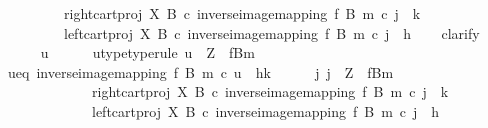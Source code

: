 \begin{isabellebody}
\ \ \ \ \ \ \ \ \ {\isacharparenleft}{\kern0pt}right{\isacharunderscore}{\kern0pt}cart{\isacharunderscore}{\kern0pt}proj\ X\ B\ {\isasymcirc}\isactrlsub c\ inverse{\isacharunderscore}{\kern0pt}image{\isacharunderscore}{\kern0pt}mapping\ f\ B\ m{\isacharparenright}{\kern0pt}\ {\isasymcirc}\isactrlsub c\ j\ {\isacharequal}{\kern0pt}\ k\ {\isasymand}\isanewline
\ \ \ \ \ \ \ \ \ {\isacharparenleft}{\kern0pt}left{\isacharunderscore}{\kern0pt}cart{\isacharunderscore}{\kern0pt}proj\ X\ B\ {\isasymcirc}\isactrlsub c\ inverse{\isacharunderscore}{\kern0pt}image{\isacharunderscore}{\kern0pt}mapping\ f\ B\ m{\isacharparenright}{\kern0pt}\ {\isasymcirc}\isactrlsub c\ j\ {\isacharequal}{\kern0pt}\ h{\isachardoublequoteclose}\isanewline
\ \ \isamarkupfalse%
\ {\isacharparenleft}{\kern0pt}clarify{\isacharparenright}{\kern0pt}\isanewline
\ \ \ \ \isamarkupfalse%
\ u\isanewline
\ \ \ \ \isamarkupfalse%
\ u{\isacharunderscore}{\kern0pt}type{\isacharbrackleft}{\kern0pt}type{\isacharunderscore}{\kern0pt}rule{\isacharbrackright}{\kern0pt}{\isacharcolon}{\kern0pt}\ {\isachardoublequoteopen}u\ {\isacharcolon}{\kern0pt}\ Z\ {\isasymrightarrow}\ {\isacharparenleft}{\kern0pt}f\isactrlsup {\isacharminus}{\kern0pt}B{\isasymrparr}\isactrlbsub m\isactrlesub {\isacharparenright}{\kern0pt}{\isachardoublequoteclose}\isanewline
\ \ \ \ \isamarkupfalse%
\ u{\isacharunderscore}{\kern0pt}eq{\isacharcolon}{\kern0pt}\ {\isachardoublequoteopen}inverse{\isacharunderscore}{\kern0pt}image{\isacharunderscore}{\kern0pt}mapping\ f\ B\ m\ {\isasymcirc}\isactrlsub c\ u\ {\isacharequal}{\kern0pt}\ {\isasymlangle}h{\isacharcomma}{\kern0pt}k{\isasymrangle}{\isachardoublequoteclose}\isanewline
\isanewline
\ \ \ \ \isamarkupfalse%
\ {\isachardoublequoteopen}{\isasymexists}j{\isachardot}{\kern0pt}\ j\ {\isacharcolon}{\kern0pt}\ Z\ {\isasymrightarrow}\ f\isactrlsup {\isacharminus}{\kern0pt}B{\isasymrparr}\isactrlbsub m\isactrlesub \ {\isasymand}\isanewline
\ \ \ \ \ \ \ \ \ \ \ \ \ {\isacharparenleft}{\kern0pt}right{\isacharunderscore}{\kern0pt}cart{\isacharunderscore}{\kern0pt}proj\ X\ B\ {\isasymcirc}\isactrlsub c\ inverse{\isacharunderscore}{\kern0pt}image{\isacharunderscore}{\kern0pt}mapping\ f\ B\ m{\isacharparenright}{\kern0pt}\ {\isasymcirc}\isactrlsub c\ j\ {\isacharequal}{\kern0pt}\ k\ {\isasymand}\isanewline
\ \ \ \ \ \ \ \ \ \ \ \ \ {\isacharparenleft}{\kern0pt}left{\isacharunderscore}{\kern0pt}cart{\isacharunderscore}{\kern0pt}proj\ X\ B\ {\isasymcirc}\isactrlsub c\ inverse{\isacharunderscore}{\kern0pt}image{\isacharunderscore}{\kern0pt}mapping\ f\ B\ m{\isacharparenright}{\kern0pt}\ {\isasymcirc}\isactrlsub c\ j\ {\isacharequal}{\kern0pt}\ h{\isachardoublequoteclose}\isanewline

\end{isabellebody}
